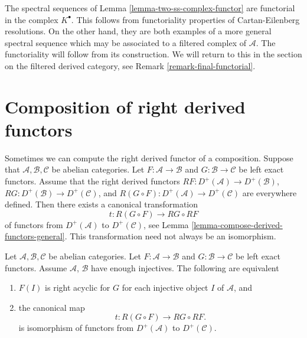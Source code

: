 \begin{remark}
\label{remark-functorial-ss}
The spectral sequences of Lemma \ref{lemma-two-ss-complex-functor}
are functorial in the complex $K^\bullet$. This follows from functoriality
properties of Cartan-Eilenberg resolutions. On the other hand, they are
both examples of a more general spectral sequence which may be associated
to a filtered complex of $\mathcal{A}$. The functoriality will follow from
its construction. We will return to this in the section on the filtered
derived category, see Remark \ref{remark-final-functorial}.
\end{remark}










\section{Composition of right derived functors}
\label{section-composition-right-derived-functors}

\noindent
Sometimes we can compute the right derived functor of a composition.
Suppose that $\mathcal{A}, \mathcal{B}, \mathcal{C}$ be abelian categories.
Let $F : \mathcal{A} \to \mathcal{B}$ and $G : \mathcal{B} \to \mathcal{C}$
be left exact functors. Assume that the right derived functors
$RF : D^{+}(\mathcal{A}) \to D^{+}(\mathcal{B})$,
$RG : D^{+}(\mathcal{B}) \to D^{+}(\mathcal{C})$, and
$R(G \circ F) : D^{+}(\mathcal{A}) \to D^{+}(\mathcal{C})$
are everywhere defined. Then there exists a canonical transformation
$$
t : R(G \circ F) \longrightarrow RG \circ RF
$$
of functors from $D^{+}(\mathcal{A})$ to $D^{+}(\mathcal{C})$, see
Lemma \ref{lemma-compose-derived-functors-general}.
This transformation need not always be an isomorphism.

\begin{lemma}
\label{lemma-compose-derived-functors}
Let $\mathcal{A}, \mathcal{B}, \mathcal{C}$ be abelian categories.
Let $F : \mathcal{A} \to \mathcal{B}$ and $G : \mathcal{B} \to \mathcal{C}$
be left exact functors. Assume $\mathcal{A}$, $\mathcal{B}$ have
enough injectives. The following are equivalent
\begin{enumerate}
\item $F(I)$ is right acyclic for $G$ for each injective object $I$
of $\mathcal{A}$, and
\item the canonical map
$$
t : R(G \circ F) \longrightarrow RG \circ RF.
$$
is isomorphism of functors from $D^{+}(\mathcal{A})$ to $D^{+}(\mathcal{C})$.
\end{enumerate}
\end{lemma}

